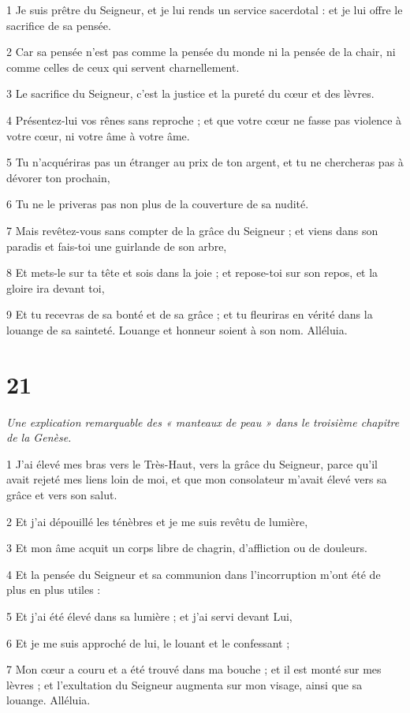 \par 1 Je suis prêtre du Seigneur, et je lui rends un service sacerdotal : et je lui offre le sacrifice de sa pensée.
\par 2 Car sa pensée n'est pas comme la pensée du monde ni la pensée de la chair, ni comme celles de ceux qui servent charnellement.
\par 3 Le sacrifice du Seigneur, c'est la justice et la pureté du cœur et des lèvres.
\par 4 Présentez-lui vos rênes sans reproche ; et que votre cœur ne fasse pas violence à votre cœur, ni votre âme à votre âme.
\par 5 Tu n'acquériras pas un étranger au prix de ton argent, et tu ne chercheras pas à dévorer ton prochain,
\par 6 Tu ne le priveras pas non plus de la couverture de sa nudité.
\par 7 Mais revêtez-vous sans compter de la grâce du Seigneur ; et viens dans son paradis et fais-toi une guirlande de son arbre,
\par 8 Et mets-le sur ta tête et sois dans la joie ; et repose-toi sur son repos, et la gloire ira devant toi,
\par 9 Et tu recevras de sa bonté et de sa grâce ; et tu fleuriras en vérité dans la louange de sa sainteté. Louange et honneur soient à son nom. Alléluia.

\chapter{21}

\par \textit{Une explication remarquable des « manteaux de peau » dans le troisième chapitre de la Genèse.}

\par 1 J'ai élevé mes bras vers le Très-Haut, vers la grâce du Seigneur, parce qu'il avait rejeté mes liens loin de moi, et que mon consolateur m'avait élevé vers sa grâce et vers son salut.
\par 2 Et j'ai dépouillé les ténèbres et je me suis revêtu de lumière,
\par 3 Et mon âme acquit un corps libre de chagrin, d'affliction ou de douleurs.
\par 4 Et la pensée du Seigneur et sa communion dans l'incorruption m'ont été de plus en plus utiles :
\par 5 Et j'ai été élevé dans sa lumière ; et j'ai servi devant Lui,
\par 6 Et je me suis approché de lui, le louant et le confessant ;
\par 7 Mon cœur a couru et a été trouvé dans ma bouche ; et il est monté sur mes lèvres ; et l'exultation du Seigneur augmenta sur mon visage, ainsi que sa louange. Alléluia.

